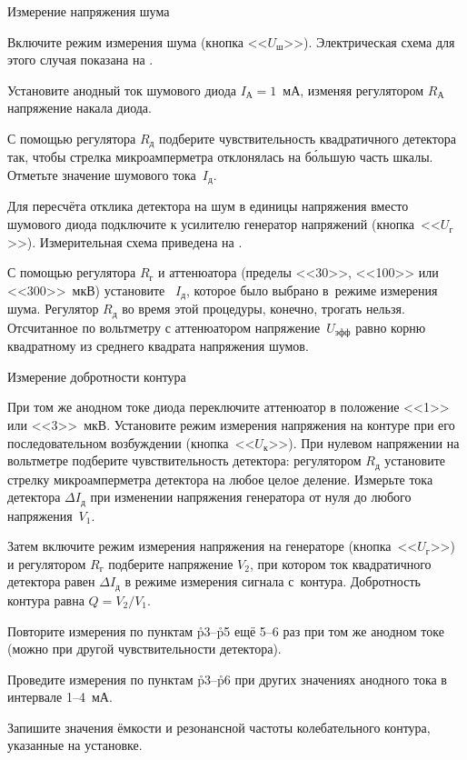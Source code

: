 \zn Измерение напряжения шума

\n[p3] Включите режим измерения шума (кнопка <<$U_ш$>>). Электрическая схема для этого случая показана на .

\n Установите анодный ток шумового диода $I_А=1$~мА, изменяя регулятором $R_А$ напряжение накала диода.

С помощью регулятора $R_д$ подберите чувствительность квадратичного детектора так, чтобы стрелка микроамперметра
отклонялась на б\'ольшую часть шкалы. Отметьте значение шумового тока~$I_д$.

Для пересчёта отклика детектора на шум в единицы напряжения вместо шумового диода подключите к усилителю генератор
напряжений (кнопка~<<$U_г$>>). Измерительная схема приведена на .


С помощью регулятора $R_г$ и аттенюатора (пределы <<30>>, <<100>> или <<300>>~мкВ) установите ~$I_д$, которое было выбрано в~режиме измерения шума. Регулятор $R_д$ во время этой процедуры, конечно, трогать
нельзя. Отсчитанное по вольтметру с аттенюатором напряжение~$U_{эфф}$ равно корню квадратному из среднего квадрата
напряжения шумов.

\zn Измерение добротности контура

\n[p5] При том же анодном токе диода переключите аттенюатор в положение <<1>> или <<3>>~мкВ. Установите режим измерения
напряжения на контуре при его последовательном возбуждении (кнопка~<<$U_к$>>). При нулевом напряжении на вольтметре
подберите чувствительность детектора: регулятором $R_д$ установите стрелку микроамперметра детектора на любое целое
деление. Измерьте  тока детектора $\Delta I_д$ при изменении напряжения генератора от нуля до любого
напряжения~$V_1$.

Затем включите режим измерения напряжения на генераторе (кнопка~<<$U_г$>>) и регулятором $R_г$ подберите напряжение
$V_2$, при котором ток квадратичного детектора равен  $\Delta I_д$ в режиме измерения сигнала с~контура.
Добротность контура равна $Q=V_2/V_1$.

\n[p6] Повторите измерения по пунктам \r{p3}--\r{p5} ещё 5--6 раз при том же анодном токе (можно при другой
чувствительности детектора).

\n Проведите измерения по пунктам \r{p3}--\r{p6} при других значениях анодного тока в интервале 1--4~мА.

\n Запишите значения ёмкости и резонансной частоты колебательного контура, указанные на установке.

